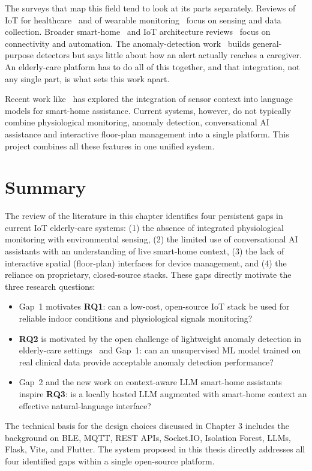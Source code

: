 The surveys that map this field tend to look at its parts separately. Reviews of IoT for healthcare~\cite{Islam2015} and of wearable monitoring~\cite{Pantelopoulos2010} focus on sensing and data collection. Broader smart-home~\cite{Alam2012} and IoT architecture reviews~\cite{Gubbi2013} focus on connectivity and automation. The anomaly-detection work~\cite{Chandola2009,Liu2008} builds general-purpose detectors but says little about how an alert actually reaches a caregiver. An elderly-care platform has to do all of this together, and that integration, not any single part, is what sets this work apart.

Recent work like~\cite{Momand2025} has explored the integration of sensor context into language models for smart-home assistance. Current systems, however, do not typically combine physiological monitoring, anomaly detection, conversational AI assistance and interactive floor-plan management into a single platform. This project combines all these features in one unified system.

\section*{Summary}
\label{sec:litreview_summary}

The review of the literature in this chapter identifies four persistent gaps in current IoT elderly-care systems: (1) the absence of integrated physiological monitoring with environmental sensing, (2) the limited use of conversational AI assistants with an understanding of live smart-home context, (3) the lack of interactive spatial (floor-plan) interfaces for device management, and (4) the reliance on proprietary, closed-source stacks. These gaps directly motivate the three research questions:

\begin{itemize}
    \item Gap~1 motivates \textbf{RQ1}: can a low-cost, open-source IoT stack be used for reliable indoor conditions and physiological signals monitoring?

    \item \textbf{RQ2} is motivated by the open challenge of lightweight anomaly detection in elderly-care settings~\cite{Ali2025,Chandola2009} and Gap~1: can an unsupervised ML model trained on real clinical data provide acceptable anomaly detection performance?

    \item Gap~2 and the new work on context-aware LLM smart-home assistants~\cite{Momand2025} inspire \textbf{RQ3}: is a locally hosted LLM augmented with smart-home context an effective natural-language interface?
\end{itemize}

The technical basis for the design choices discussed in Chapter 3 includes the background on BLE, MQTT, REST APIs, Socket.IO, Isolation Forest, LLMs, Flask, Vite, and Flutter. The system proposed in this thesis directly addresses all four identified gaps within a single open-source platform.